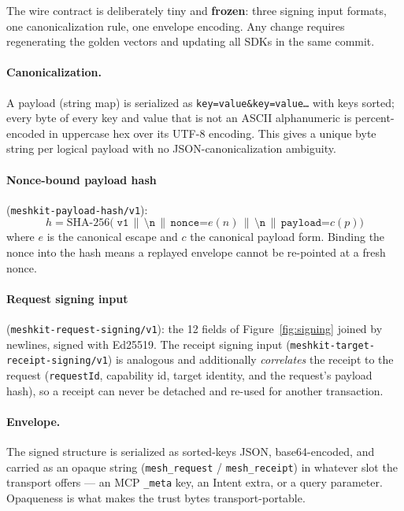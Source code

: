 \documentclass[10pt,twocolumn]{article}
\newcommand{\field}[1]{\texttt{#1}}
\begin{document}
The wire contract is deliberately tiny and \textbf{frozen}: three signing
input formats, one canonicalization rule, one envelope encoding. Any change
requires regenerating the golden vectors and updating all SDKs in the same
commit.

\paragraph{Canonicalization.} A payload (string map) is serialized as
\field{key=value\&key=value\ldots} with keys sorted; every byte of every
key and value that is not an ASCII alphanumeric is percent-encoded in
uppercase hex over its UTF-8 encoding. This gives a unique byte string per
logical payload with no JSON-canonicalization ambiguity.

\paragraph{Nonce-bound payload hash} (\field{meshkit-payload-hash/v1}):
\[
  h = \mathrm{SHA\mbox{-}256}\big(\;
      \field{v1} \,\|\, \field{\textbackslash n} \,\|\,
      \field{nonce=}e(n) \,\|\, \field{\textbackslash n} \,\|\,
      \field{payload=}c(p) \big)
\]
where $e$ is the canonical escape and $c$ the canonical payload form.
Binding the nonce into the hash means a replayed envelope cannot be
re-pointed at a fresh nonce.

\paragraph{Request signing input}
(\field{meshkit-request-signing/v1}): the 12 fields of
Figure~\ref{fig:signing} joined by newlines, signed with Ed25519.
The receipt signing input (\field{meshkit-target-receipt-signing/v1}) is
analogous and additionally \emph{correlates} the receipt to the request
(\field{requestId}, capability id, target identity, and the request's
payload hash), so a receipt can never be detached and re-used for another
transaction.

\paragraph{Envelope.} The signed structure is serialized as sorted-keys
JSON, base64-encoded, and carried as an opaque string
(\field{mesh\_request} / \field{mesh\_receipt}) in whatever slot the
transport offers --- an MCP \field{\_meta} key, an Intent extra, or a query
parameter. Opaqueness is what makes the trust bytes transport-portable.
\end{document}
